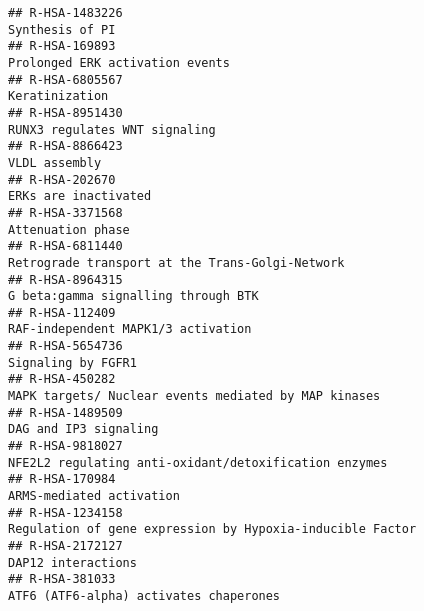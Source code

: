 \documentclass[
]{article}
\begin{document}
\begin{verbatim}
## R-HSA-1483226                                                                                                                      Synthesis of PI
## R-HSA-169893                                                                                                       Prolonged ERK activation events
## R-HSA-6805567                                                                                                                       Keratinization
## R-HSA-8951430                                                                                                        RUNX3 regulates WNT signaling
## R-HSA-8866423                                                                                                                        VLDL assembly
## R-HSA-202670                                                                                                                  ERKs are inactivated
## R-HSA-3371568                                                                                                                    Attenuation phase
## R-HSA-6811440                                                                                      Retrograde transport at the Trans-Golgi-Network
## R-HSA-8964315                                                                                                  G beta:gamma signalling through BTK
## R-HSA-112409                                                                                                    RAF-independent MAPK1/3 activation
## R-HSA-5654736                                                                                                                   Signaling by FGFR1
## R-HSA-450282                                                                                  MAPK targets/ Nuclear events mediated by MAP kinases
## R-HSA-1489509                                                                                                                DAG and IP3 signaling
## R-HSA-9818027                                                                                NFE2L2 regulating anti-oxidant/detoxification enzymes
## R-HSA-170984                                                                                                              ARMS-mediated activation
## R-HSA-1234158                                                                            Regulation of gene expression by Hypoxia-inducible Factor
## R-HSA-2172127                                                                                                                   DAP12 interactions
## R-HSA-381033                                                                                                ATF6 (ATF6-alpha) activates chaperones

\end{verbatim}
\end{document}
